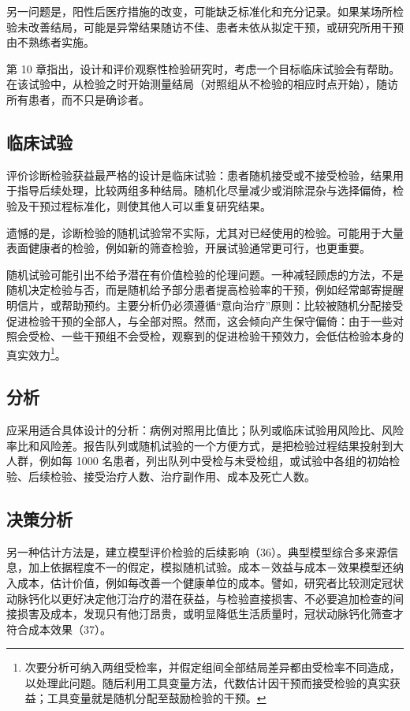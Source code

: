另一问题是，阳性后医疗措施的改变，可能缺乏标准化和充分记录。如果某场所检验未改善结局，可能是异常结果随访不佳、患者未依从拟定干预，或研究所用干预由不熟练者实施。

第 10 章指出，设计和评价观察性检验研究时，考虑一个目标临床试验会有帮助。在该试验中，从检验之时开始测量结局（对照组从不检验的相应时点开始），随访所有患者，而不只是确诊者。

\subsection{临床试验}
评价诊断检验获益最严格的设计是临床试验：患者随机接受或不接受检验，结果用于指导后续处理，比较两组多种结局。随机化尽量减少或消除混杂与选择偏倚，检验及干预过程标准化，则使其他人可以重复研究结果。

遗憾的是，诊断检验的随机试验常不实际，尤其对已经使用的检验。可能用于大量表面健康者的检验，例如新的筛查检验，开展试验通常更可行，也更重要。

随机试验可能引出不给予潜在有价值检验的伦理问题。一种减轻顾虑的方法，不是随机决定检验与否，而是随机给予部分患者提高检验率的干预，例如经常邮寄提醒明信片，或帮助预约。主要分析仍必须遵循“意向治疗”原则：比较被随机分配接受促进检验干预的全部人，与全部对照。然而，这会倾向产生保守偏倚：由于一些对照会受检、一些干预组不会受检，观察到的促进检验干预效力，会低估检验本身的真实效力\footnote{次要分析可纳入两组受检率，并假定组间全部结局差异都由受检率不同造成，以处理此问题。随后利用工具变量方法，代数估计因干预而接受检验的真实获益；工具变量就是随机分配至鼓励检验的干预。}。

\subsection{分析}
应采用适合具体设计的分析：病例对照用比值比；队列或临床试验用风险比、风险率比和风险差。报告队列或随机试验的一个方便方式，是把检验过程结果投射到大人群，例如每 1000 名患者，列出队列中受检与未受检组，或试验中各组的初始检验、后续检验、接受治疗人数、治疗副作用、成本及死亡人数。

\subsection{决策分析}
另一种估计方法是，建立模型评价检验的后续影响（36）。典型模型综合多来源信息，加上依据程度不一的假定，模拟随机试验。成本－效益与成本－效果模型还纳入成本，估计价值，例如每改善一个健康单位的成本。譬如，研究者比较测定冠状动脉钙化以更好决定他汀治疗的潜在获益，与检验直接损害、不必要追加检查的间接损害及成本，发现只有他汀昂贵，或明显降低生活质量时，冠状动脉钙化筛查才符合成本效果（37）。

